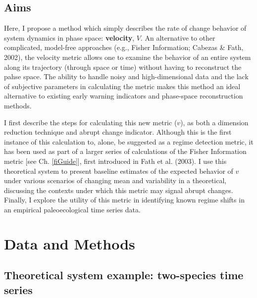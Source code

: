\documentclass[12pt,twoside,openany]{reedthesis}
\begin{document}
\hypertarget{aims-1}{%
\subsection{Aims}\label{aims-1}}

Here, I propose a method which simply describes the rate of change behavior of system dynamics in phase space: \textbf{velocity}, \(V\). An alternative to other complicated, model-free approaches (e.g., Fisher Information; Cabezas \& Fath, 2002), the velocity metric allows one to examine the behavior of an entire system along its trajectory
(through space or time) without having to reconstruct the pahse space. The ability to handle noisy and high-dimensional data and the lack of subjective parameters in calculating the metric makes this method an ideal alternative to existing early warning indicators and phase-space reconstruction methods.

I first describe the steps for calculating this new metric (\(v\)), as both a dimension reduction technique and abrupt change indicator. Although this is the first instance of this calculation to, alone, be suggested as a regime detection metric, it has been used as part of a larger series of calculations of the Fisher Information metric {[}see Ch. \ref{fiGuide}{]}, first introduced in Fath et al. (2003). I use this theoretical system to present baseline estimates of the expected behavior of \(v\) under various scenarios of changing mean and variability in a theoretical, discussing the contexts under which this metric may signal abrupt changes. Finally, I explore the utility of this metric in identifying known regime shifts in an empirical paleoecological time series data.

\hypertarget{data-and-methods-1}{%
\section{Data and Methods}\label{data-and-methods-1}}

\hypertarget{theoretical-system-example-two-species-time-series}{%
\subsection{Theoretical system example: two-species time series}\label{theoretical-system-example-two-species-time-series}}
\end{document}
